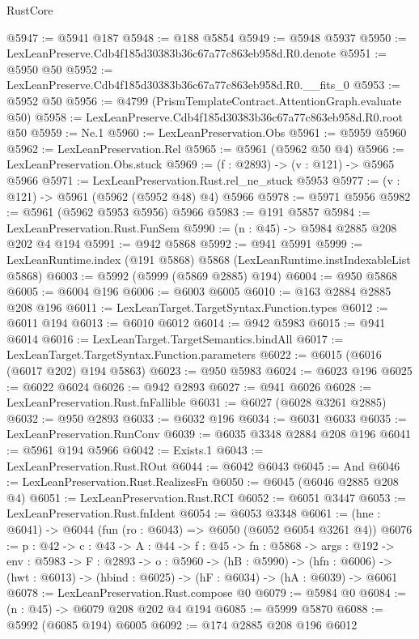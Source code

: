 \begin{lexlean}{RustCore}
\begin{coremodule}
@5947 := @5941 @187
@5948 := @188 @5854
@5949 := @5948 @5937
@5950 := LexLeanPreserve.Cdb4f185d30383b36c67a77c863eb958d.R0.denote
@5951 := @5950 @50
@5952 := LexLeanPreserve.Cdb4f185d30383b36c67a77c863eb958d.R0.__fits_0
@5953 := @5952 @50
@5956 := @4799 (PrismTemplateContract.AttentionGraph.evaluate @50)
@5958 := LexLeanPreserve.Cdb4f185d30383b36c67a77c863eb958d.R0.root @50
@5959 := Ne.{1}
@5960 := LexLeanPreservation.Obs
@5961 := @5959 @5960
@5962 := LexLeanPreservation.Rel
@5965 := @5961 (@5962 @50 @4)
@5966 := LexLeanPreservation.Obs.stuck
@5969 := (f : @2893) -> (v : @121) -> @5965 @5966
@5971 := LexLeanPreservation.Rust.rel_ne_stuck @5953
@5977 := (v : @121) -> @5961 (@5962 (@5952 @48) @4) @5966
@5978 := @5971 @5956
@5982 := @5961 (@5962 @5953 @5956) @5966
@5983 := @191 @5857
@5984 := LexLeanPreservation.Rust.FunSem
@5990 := (n : @45) -> @5984 @2885 @208 @202 @4 @194
@5991 := @942 @5868
@5992 := @941 @5991
@5999 := LexLeanRuntime.index (@191 @5868) @5868 (LexLeanRuntime.instIndexableList @5868)
@6003 := @5992 (@5999 (@5869 @2885) @194)
@6004 := @950 @5868
@6005 := @6004 @196
@6006 := @6003 @6005
@6010 := @163 @2884 @2885 @208 @196
@6011 := LexLeanTarget.TargetSyntax.Function.types
@6012 := @6011 @194
@6013 := @6010 @6012
@6014 := @942 @5983
@6015 := @941 @6014
@6016 := LexLeanTarget.TargetSemantics.bindAll
@6017 := LexLeanTarget.TargetSyntax.Function.parameters
@6022 := @6015 (@6016 (@6017 @202) @194 @5863)
@6023 := @950 @5983
@6024 := @6023 @196
@6025 := @6022 @6024
@6026 := @942 @2893
@6027 := @941 @6026
@6028 := LexLeanPreservation.Rust.fnFallible
@6031 := @6027 (@6028 @3261 @2885)
@6032 := @950 @2893
@6033 := @6032 @196
@6034 := @6031 @6033
@6035 := LexLeanPreservation.RunConv
@6039 := @6035 @3348 @2884 @208 @196
@6041 := @5961 @194 @5966
@6042 := Exists.{1}
@6043 := LexLeanPreservation.Rust.ROut
@6044 := @6042 @6043
@6045 := And
@6046 := LexLeanPreservation.Rust.RealizesFn
@6050 := @6045 (@6046 @2885 @208 @4)
@6051 := LexLeanPreservation.Rust.RCI
@6052 := @6051 @3447
@6053 := LexLeanPreservation.Rust.fnIdent
@6054 := @6053 @3348
@6061 := (hne : @6041) -> @6044 (fun (ro : @6043) => @6050 (@6052 @6054 @3261 @4))
@6076 := {p : @42} ->
  {c : @43} ->
  {A : @44} ->
  {f : @45} ->
  {fn : @5868} ->
  {args : @192} ->
  {env : @5983} ->
  {F : @2893} ->
  {o : @5960} ->
  (hB : @5990) ->
  (hfn : @6006) -> (hwt : @6013) -> (hbind : @6025) -> (hF : @6034) -> (hA : @6039) -> @6061
@6078 := LexLeanPreservation.Rust.compose @0
@6079 := @5984 @0
@6084 := (n : @45) -> @6079 @208 @202 @4 @194
@6085 := @5999 @5870
@6088 := @5992 (@6085 @194) @6005
@6092 := @174 @2885 @208 @196 @6012

\end{coremodule}
\end{lexlean}
